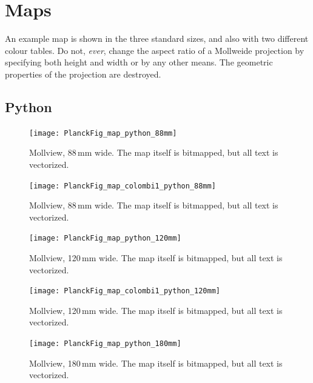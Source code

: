 \documentclass[traditabstract]{aa}
\begin{document}
\clearpage











\section{Maps}

An example map is shown in the three standard sizes, and also with two different colour tables.  Do not, \textit{ever}, change the aspect ratio of a Mollweide projection by specifying both height and width or by any other means.  The geometric properties of the projection are destroyed.  


\subsection{Python}


\begin{figure}[ht]
\texttt{[image: PlanckFig\_map\_python\_88mm]}
\caption{Mollview, 88\,mm wide.  The map itself is bitmapped, but all text is vectorized.} 
\label{fig:map_python88} 
\end{figure}

\begin{figure}[ht]
\texttt{[image: PlanckFig\_map\_colombi1\_python\_88mm]}
\caption{Mollview, 88\,mm wide.  The map itself is bitmapped, but all text is vectorized.} 
\label{fig:map_parchment_python88}
\end{figure}



\begin{figure}[ht]
\sidecaption
\texttt{[image: PlanckFig\_map\_python\_120mm]}
\caption{Mollview, 120\,mm wide.  The map itself is bitmapped, but all text is vectorized.}
\label{fig:map_python120} 
\end{figure}

\begin{figure}[ht]
\sidecaption
\texttt{[image: PlanckFig\_map\_colombi1\_python\_120mm]}
\caption{Mollview, 120\,mm wide.  The map itself is bitmapped, but all text is vectorized.} 
\label{fig:map_parchment_python120}
\end{figure}



\begin{figure}[H!b]
\texttt{[image: PlanckFig\_map\_python\_180mm]}
\caption{Mollview, 180\,mm wide.  The map itself is bitmapped, but all text is vectorized.}
\label{fig:map_python180}
\end{figure}
\end{document}
